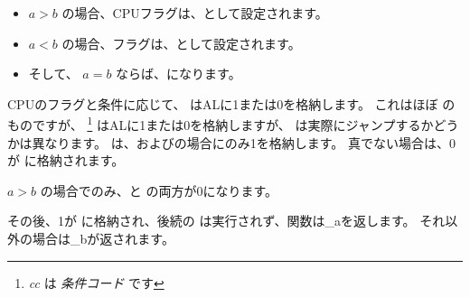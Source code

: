 \begin{itemize}
\item $a>b$ の場合、CPUフラグは、として設定されます。
\item $a<b$ の場合、フラグは、として設定されます。
\item そして、 $a=b$ ならば、になります。
\end{itemize}


CPUのフラグと条件に応じて、 \SETNBE はALに1または0を格納します。 
これはほぼ \JNBE のものですが、 \SETcc
\footnote{\emph{cc} は \emph{条件コード} です}
はALに1または0を格納しますが、 \Jcc は実際にジャンプするかどうかは異なります。
\SETNBE は、およびの場合にのみ1を格納します。 
真でない場合は、0が \AL に格納されます。

$a>b$ の場合でのみ、\CF と \ZF の両方が0になります。

その後、1が \AL に格納され、後続の \JZ は実行されず、関数は{\_a}を返します。 
それ以外の場合は{\_b}が返されます。
